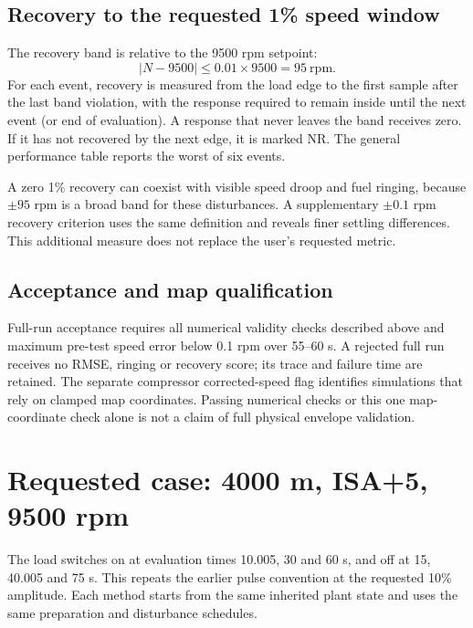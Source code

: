 \documentclass[11pt,a4paper]{article}
\begin{document}
\subsection{Recovery to the requested 1\% speed window}
The recovery band is relative to the 9500 rpm setpoint:
\begin{equation}
|N-9500|\leq0.01\times9500=95\ \mathrm{rpm}.
\end{equation}
For each event, recovery is measured from the load edge to the first sample after the last band violation, with the response required to remain inside until the next event (or end of evaluation). A response that never leaves the band receives zero. If it has not recovered by the next edge, it is marked NR. The general performance table reports the worst of six events.

A zero 1\% recovery can coexist with visible speed droop and fuel ringing, because $\pm95$ rpm is a broad band for these disturbances. A supplementary $\pm0.1$ rpm recovery criterion uses the same definition and reveals finer settling differences. This additional measure does not replace the user's requested metric.

\subsection{Acceptance and map qualification}
Full-run acceptance requires all numerical validity checks described above and maximum pre-test speed error below 0.1 rpm over 55--60 s. A rejected full run receives no RMSE, ringing or recovery score; its trace and failure time are retained. The separate compressor corrected-speed flag identifies simulations that rely on clamped map coordinates. Passing numerical checks or this one map-coordinate check alone is not a claim of full physical envelope validation.

\clearpage
\section{Requested case: 4000 m, ISA+5, 9500 rpm}
The load switches on at evaluation times 10.005, 30 and 60 s, and off at 15, 40.005 and 75 s. This repeats the earlier pulse convention at the requested 10\% amplitude. Each method starts from the same inherited plant state and uses the same preparation and disturbance schedules.
\end{document}
